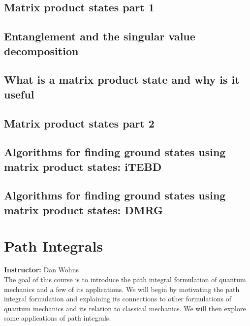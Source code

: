 \documentclass{book}
\theoremstyle{definition}
\begin{document}
\newpage


\section{Matrix product states part 1}




\section{Entanglement and the singular value decomposition}



\section{What is a matrix product state and why is it useful}
\newpage





\section{Matrix product states part 2}




\section{Algorithms for finding ground states using matrix product states: iTEBD }




\section{Algorithms for finding ground states using matrix product states: DMRG}

\newpage











\chapter{Path Integrals}

\textbf{Instructor:} Dan Wohns\\

The goal of this course is to introduce the path integral formulation of quantum mechanics and a few of its applications. We will begin by motivating the path integral formulation and explaining its connections to other formulations of quantum mechanics and its relation to classical mechanics. We will then explore some applications of path integrals.
\end{document}
